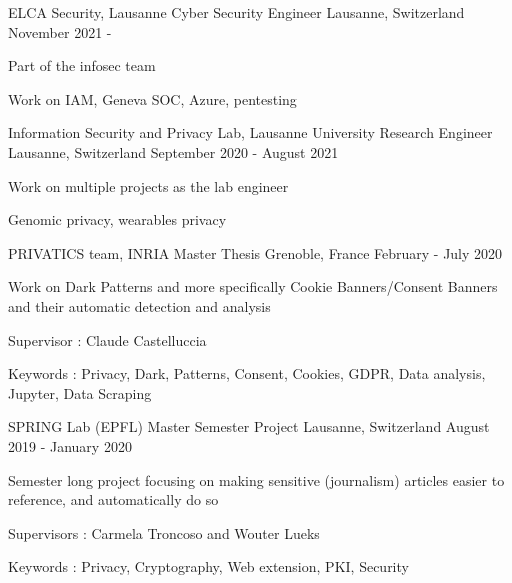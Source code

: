 


\begin{cventries}
	
	\cventry
	{ELCA Security, Lausanne} %
	{Cyber Security Engineer} %
	{Lausanne, Switzerland} %
	{November 2021 - } %
	{ %
		\begin{cvitems}
			\item {Part of the infosec team}
			\item {Work on IAM, Geneva SOC, Azure, pentesting}
		\end{cvitems}
	}
	
	\cventry
	{Information Security and Privacy Lab, Lausanne University} %
	{Research Engineer} %
	{Lausanne, Switzerland} %
	{September 2020 - August 2021} %
	{ %
		\begin{cvitems}
			\item {Work on multiple projects as the lab engineer}
			\item {Genomic privacy, wearables privacy}
		\end{cvitems}
	}
	
	\cventry
	{PRIVATICS team, INRIA} %
	{Master Thesis} %
	{Grenoble, France} %
	{February - July 2020} %
	{ %
		\begin{cvitems}
			\item {Work on Dark Patterns and more specifically Cookie Banners/Consent Banners and their automatic detection and analysis}
			\item {Supervisor : Claude Castelluccia}
			\item {Keywords : Privacy, Dark, Patterns, Consent, Cookies, GDPR, Data analysis, Jupyter, Data Scraping}
		\end{cvitems}
	}
	
	\cventry
	{SPRING Lab (EPFL)} %
	{Master Semester Project} %
	{Lausanne, Switzerland} %
	{August 2019 - January 2020} %
	{ %
		\begin{cvitems}
			\item {Semester long project focusing on making sensitive (journalism) articles easier to reference, and automatically do so}
			\item {Supervisors : Carmela Troncoso and Wouter Lueks}
			\item {Keywords : Privacy, Cryptography, Web extension, PKI, Security}
		\end{cvitems}
	}
	

\end{cventries}
